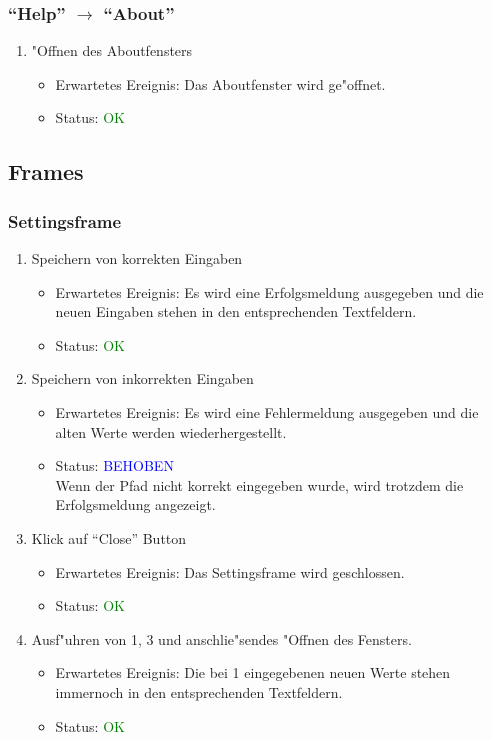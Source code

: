 \subsubsection{"`Help"' $\rightarrow$ "`About"'}
\begin{enumerate}
\item "Offnen des Aboutfensters
\begin{itemize}
\item Erwartetes Ereignis: Das Aboutfenster wird ge"offnet. 
\item Status: \textcolor{green}{OK}
\end{itemize}
\end{enumerate}

\subsection{Frames}
\subsubsection{Settingsframe}
\begin{enumerate}
\item Speichern von korrekten Eingaben
\begin{itemize}
\item Erwartetes Ereignis: Es wird eine Erfolgsmeldung ausgegeben und die neuen Eingaben stehen in den entsprechenden Textfeldern.
\item Status: \textcolor{green}{OK}
\end{itemize}
\item Speichern von inkorrekten Eingaben
\begin{itemize}
\item Erwartetes Ereignis: Es wird eine Fehlermeldung ausgegeben und die alten Werte werden wiederhergestellt.  
\item Status: \textcolor{blue}{BEHOBEN} \\
Wenn der Pfad nicht korrekt eingegeben wurde, wird trotzdem die Erfolgsmeldung angezeigt.
\end{itemize}
\item Klick auf "`Close"' Button
\begin{itemize}
\item Erwartetes Ereignis: Das Settingsframe wird geschlossen.
\item Status: \textcolor{green}{OK}
\end{itemize}
\item Ausf"uhren von 1, 3 und anschlie"sendes "Offnen des Fensters.
\begin{itemize}
\item Erwartetes Ereignis: Die bei 1 eingegebenen neuen Werte stehen immernoch in den entsprechenden Textfeldern.
\item Status: \textcolor{green}{OK}
\end{itemize}
\end{enumerate}
